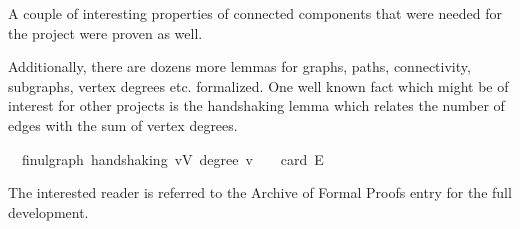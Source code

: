 A couple of interesting properties of connected components that were needed for the project were proven as well.

Additionally, there are dozens more lemmas for graphs, paths, connectivity, subgraphs, vertex degrees etc. formalized.
One well known fact which might be of interest for other projects is the handshaking lemma which relates the number of edges with the sum of vertex degrees.

\begin{isabellebox}
    \isamarkupfalse%
    \ {\isacharparenleft}{\kern0pt}\ fin{\isacharunderscore}{\kern0pt}ulgraph{\isacharparenright}{\kern0pt}\ handshaking{\isacharcolon}{\kern0pt}\ {\isachardoublequoteopen}{\isacharparenleft}{\kern0pt}{\isasymSum}v{\isasymin}V{\isachardot}{\kern0pt}\ degree\ v{\isacharparenright}{\kern0pt}\ {\isacharequal}{\kern0pt}\ {}\ {\isacharasterisk}{\kern0pt}\ card\ E{\isachardoublequoteclose}
\end{isabellebox}

The interested reader is referred to the Archive of Formal Proofs entry for the full development.
